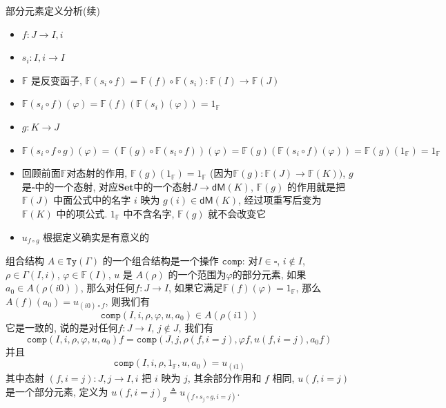 \documentclass[aspectratio=169,xcolor=dvipsnames]{beamer}
\newcommand\bbF{\mathbb{F}}
\newcommand\comp{\mathtt{comp}}
\newcommand\Ty{\mathtt{Ty}}
\newcommand\dM{\mathsf{dM}}
\newcommand\Set{\mathbf{Set}}
\begin{document}
\begin{frame}{部分元素定义分析(续)}
  \begin{itemize}
    \item $f : J \to I,i$
    \item $s_i: I,i\to I$
    \item $\bbF$ 是反变函子, $\bbF(s_i\circ f) =\bbF(f)\circ\bbF(s_i): \bbF(I)\to\bbF(J)$
    \item $\bbF(s_i\circ f)(\varphi) =\bbF(f)(\bbF(s_i)(\varphi))= 1_{\bbF}$
    \item $g : K \to J$
    \item $\bbF(s_i\circ f\circ g)(\varphi) = (\bbF(g)\circ\bbF(s_i\circ f))(\varphi) =\bbF(g)(\bbF(s_i\circ f)(\varphi)) =\bbF(g)(1_{\bbF})=1_{\bbF}$
    \item 回顾前面$\bbF$对态射的作用, $\bbF(g)(1_{\bbF}) = 1_{\bbF}$ (因为$\bbF(g):\bbF(J)\to\bbF(K))$, $g$是$\square$中的一个态射, 对应$\Set$中的一个态射$J\to\dM(K)$, $\bbF(g)$ 的作用就是把 $\bbF(J)$ 中面公式中的名字 $i$ 映为 $g(i)\in\dM(K)$, 经过项重写后变为 $\bbF(K)$ 中的项公式. $1_{\bbF}$ 中不含名字, $\bbF(g)$ 就不会改变它
    \item $u_{f\circ g}$ 根据定义确实是有意义的
  \end{itemize}
\end{frame}

\begin{frame}{组合结构}
  $A\in\Ty(\Gamma)$ 的一个组合结构是一个操作 $\comp$: 对$I\in\square$, $i\notin I$, $\rho\in\Gamma(I,i)$, $\varphi\in\bbF(I)$, $u$ 是 $A(\rho)$ 的一个范围为$\varphi$的部分元素, 如果$a_0\in A(\rho(i0))$, 那么对任何$f:J\to I$, 如果它满足$\bbF(f)(\varphi)=1_{\bbF}$, 那么$A(f)(a_0)=u_{(i0)\circ f}$, 则我们有
  \[
  \comp(I,i,\rho,\varphi,u,a_0) \in A(\rho(i1))
  \]
  它是一致的, 说的是对任何$f:J\to I$, $j\notin J$, 我们有
  \[
  \comp(I,i,\rho,\varphi,u,a_0)f = \comp(J,j,\rho(f,i=j),\varphi f,u(f,i=j),a_0f)
  \]
  并且\[
  \comp(I,i,\rho,1_{\bbF},u,a_0) = u_{(i1)}
  \]
  其中态射 $(f,i=j):J,j\to I,i$ 把 $i$ 映为 $j$, 其余部分作用和 $f$ 相同, $u(f,i=j)$ 是一个部分元素, 定义为 $u(f,i=j)_{g}\triangleq u_{(f\circ s_j\circ g,i=j)}$.
\end{frame}
\end{document}

